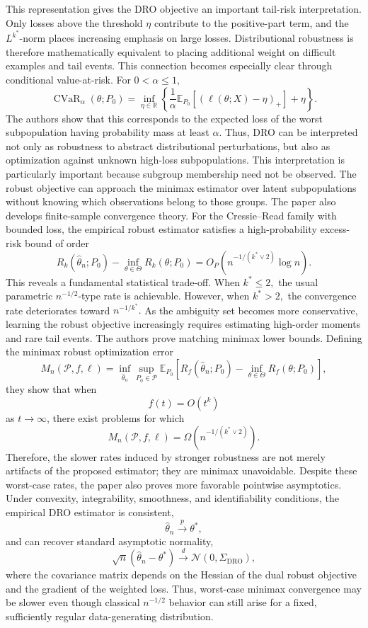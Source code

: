 \documentclass[11pt]{article}
\begin{document}
This representation gives the DRO objective an important tail-risk interpretation. Only losses above the threshold \(\eta\) contribute to the positive-part term, and the \(L^{k^*}\)-norm places increasing emphasis on large losses. Distributional robustness is therefore mathematically equivalent to placing additional weight on difficult examples and tail events.
This connection becomes especially clear through conditional value-at-risk. For \(0<\alpha\leq1\),
\[
\operatorname{CVaR}_{\alpha}(\theta;P_0)
=
\inf_{\eta\in\mathbb{R}}
\left\{
\frac{1}{\alpha}
\mathbb{E}_{P_0}
\left[
\left(
\ell(\theta;X)-\eta
\right)_+
\right]
+
\eta
\right\}.
\]
The authors show that this corresponds to the expected loss of the worst subpopulation having probability mass at least \(\alpha\). Thus, DRO can be interpreted not only as robustness to abstract distributional perturbations, but also as optimization against unknown high-loss subpopulations.
This interpretation is particularly important because subgroup membership need not be observed. The robust objective can approach the minimax estimator over latent subpopulations without knowing which observations belong to those groups.
The paper also develops finite-sample convergence theory. For the Cressie--Read family with bounded loss, the empirical robust estimator satisfies a high-probability excess-risk bound of order
\[
R_k(\widehat{\theta}_n;P_0)
-
\inf_{\theta\in\Theta}
R_k(\theta;P_0)
=
O_P
\left(
n^{-1/(k^*\vee 2)}
\log n
\right).
\]
This reveals a fundamental statistical trade-off. When
$
k^*\leq2,
$
the usual parametric \(n^{-1/2}\)-type rate is achievable. However, when
$
k^*>2,
$
the convergence rate deteriorates toward
$
n^{-1/k^*}.
$
As the ambiguity set becomes more conservative, learning the robust objective increasingly requires estimating high-order moments and rare tail events.
The authors prove matching minimax lower bounds. Defining the minimax robust optimization error
\[
M_n(\mathcal{P},f,\ell)
=
\inf_{\widehat{\theta}_n}
\sup_{P_0\in\mathcal{P}}
\mathbb{E}_{P_0}
\left[
R_f(\widehat{\theta}_n;P_0)
-
\inf_{\theta\in\Theta}
R_f(\theta;P_0)
\right],
\]
they show that when
\[
f(t)=O(t^k)
\]
as \(t\rightarrow\infty\), there exist problems for which
\[
M_n(\mathcal{P},f,\ell)
=
\Omega
\left(
n^{-1/(k^*\vee2)}
\right).
\]
Therefore, the slower rates induced by stronger robustness are not merely artifacts of the proposed estimator; they are minimax unavoidable.
Despite these worst-case rates, the paper also proves more favorable pointwise asymptotics. Under convexity, integrability, smoothness, and identifiability conditions, the empirical DRO estimator is consistent,
\[
\widehat{\theta}_n
\overset{p}{\longrightarrow}
\theta^*,
\]
and can recover standard asymptotic normality,
\[
\sqrt{n}
\left(
\widehat{\theta}_n-\theta^*
\right)
\overset{d}{\longrightarrow}
\mathcal{N}(0,\Sigma_{\mathrm{DRO}}),
\]
where the covariance matrix depends on the Hessian of the dual robust objective and the gradient of the weighted loss. Thus, worst-case minimax convergence may be slower even though classical \(n^{-1/2}\) behavior can still arise for a fixed, sufficiently regular data-generating distribution.
\end{document}
